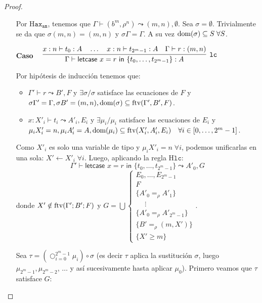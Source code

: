 \begin{proof}
\begin{itemize}
Por $\text{H}\mathtt{ax_{am}}$, tenemos que $\Gamma \vdash (b^m, \rho^n)\leadsto (m, n), \emptyset$. Sea $\sigma=\emptyset$. Trivialmente se da que $\sigma (m, n) = (m, n)$ y $\sigma \Gamma = \Gamma$. A su vez $\text{dom}(\sigma) \subseteq S\;\forall S$.

\vspace{\baselineskip}
     \item[\textbf{Caso}] \(\quad\raisebox{-.35\baselineskip}{\infer[\mathtt{lc}]
     {\Gamma \vdash \textsf{letcase } x = r \textsf{ in  }\{t_0,\dots,t_{2^m-1}\} : A}
     {x:n\vdash t_0 : A \quad \dots\quad x:n\vdash t_{2^m-1}:A\quad \Gamma \vdash r:(m, n)}}\)

Por hipótesis de inducción tenemos que:
\begin{itemize}
    \item $\Gamma' \vdash r \leadsto B', F$ y $\exists \sigma / \sigma$ satisface las ecuaciones de $F$ y $\sigma \Gamma'=\Gamma, \sigma B' = (m, n), \text{dom}(\sigma) \subseteq \text{ftv}(\Gamma',B',F)$. 
    \item $x: X'_i \vdash t_i \leadsto A'_i, E_i$ y $\exists \mu_i/\mu_i$ satisface las ecuaciones de $E_i$ y $\mu_i X'_i = n, \mu_i A'_i = A, \text{dom}(\mu_i)\subseteq \text{ftv}(X'_i,A'_i,E_i) \quad \forall i \in [0,\dots,2^m-1]$.
\end{itemize}

Como $X'_i$ es solo una variable de tipo y $\mu_i X'_i=n\;\forall i$, podemos unificarlas en una sola: $X' \leftarrow X'_i\;\forall i$. Luego, aplicando la regla $\text{H}\mathtt{lc}$:
\[\Gamma'\vdash \textsf{letcase } x = r \textsf{ in } \{t_0,\dots,t_{2^m-1}\} \leadsto A'_0, G\]
donde $X' \notin \text{ftv}(\Gamma';B';F)$ y \(G=\bigcup \begin{cases}
    E_0, \dots, E_{2^m-1} \\
    F \\
    \{A'_0 =_\rho A'_1\} \\
    \quad\; \vdots \\
    \{A'_0 =_\rho A'_{2^m-1}\} \\
    \{B' =_\rho (m, X')\} \\
    \{X'\geq m\}
\end{cases}\).

Sea $\tau = \left(\bigcirc_{i=0}^{2^m-1} \mu_i\right) \circ \sigma$ (es decir $\tau$ aplica la sustitución $\sigma$, luego $\mu_{2^m-1}, \mu_{2^m-2}$, $\dots$ y así sucesivamente hasta aplicar $\mu_0$). Primero veamos que $\tau$ satisface $G$:
   

\end{itemize}
\end{proof}

